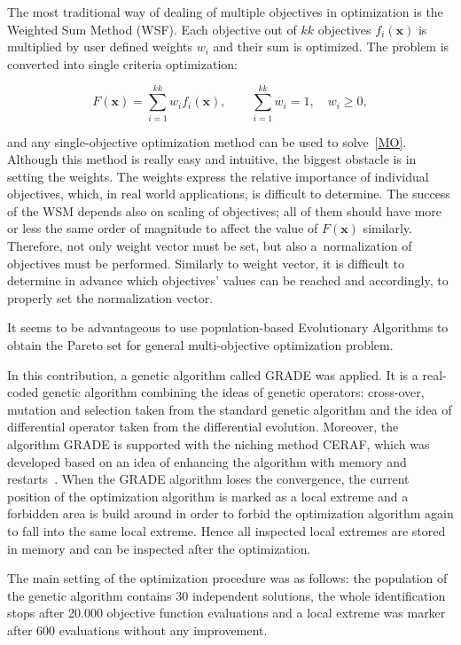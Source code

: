 \documentclass[review]{elsarticle}
\newenvironment{lineq}
    {\begin{linenomath*}
    \begin{equation}
    }
    { 
    \end{equation} 
    \end{linenomath*}
    }
\renewcommand{\vec}{\mathbf}
\begin{document}
The most traditional way of dealing of multiple objectives in optimization is the Weighted Sum Method (WSF). Each objective out of $kk$ objectives $f_i(\vec{x})$ is multiplied by user defined weights $w_i$ and their sum is optimized. The problem is converted into single criteria optimization:
%
\begin{lineq}\label{MO}
    F(\vec{x}) = \sum_{i=1}^{kk} w_i f_i(\vec{x}) , \quad\quad \sum_{i=1}^{kk} w_i = 1, \quad w_i \ge 0 ,
\end{lineq}
and any single-objective optimization method can be used to solve~\eqref{MO}. Although this method is really easy and intuitive, the biggest obstacle is in setting the weights. The weights express the relative importance of individual objectives, which, in real world applications, is difficult to determine. The success of the WSM depends also on scaling of objectives; all of them should have more or less the same order of magnitude to affect the value of $F(\vec{x})$ similarly. Therefore, not only weight vector must be set, but also a~normalization of objectives must be performed. Similarly to weight vector, it is difficult to determine in advance which objectives' values can be reached and accordingly, to properly set the normalization vector.

It seems to be advantageous to use population-based Evolutionary Algorithms to obtain the Pareto set for general multi-objective optimization problem.

In this contribution, a genetic algorithm called GRADE \citep{grade,Kucerova:2007:PHD} was applied. It is a real-coded genetic algorithm combining the ideas of genetic operators: cross-over, mutation and selection taken from the
standard genetic algorithm and the idea of differential operator taken from the differential evolution.
Moreover, the algorithm GRADE is supported with the niching method
CERAF, which was developed based on an idea of enhancing the algorithm with
memory and restarts~\citep{ceraf}. When the GRADE algorithm loses the convergence, the current position of the optimization algorithm is marked as a local extreme and a forbidden area is build around in order to forbid the optimization algorithm again to fall into the same local extreme. Hence all inspected local extremes are stored in memory and can be inspected after the optimization. 

The main setting of the optimization procedure was as follows: the population of the genetic algorithm contains 30 independent solutions, the whole identification stops after 20.000 objective function evaluations and a local extreme was marker after 600 evaluations without any improvement.
\end{document}
